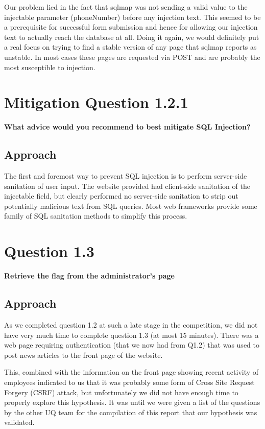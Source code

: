 Our problem lied in the fact that sqlmap was not sending a
valid value to the injectable parameter (phoneNumber) before any injection text.
This seemed to be a prerequisite for successful form submission and hence for
allowing our injection text to actually reach the database at all. Doing it
again, we would definitely put a real focus on trying to find a stable version
of any page that sqlmap reports as unstable. In most cases these pages are
requested via POST and are probably the most susceptible to injection.

\section{Mitigation Question 1.2.1}
\textbf{What advice would you recommend to best mitigate SQL Injection?}
\subsection{Approach}
The first and foremost way to prevent SQL injection is to perform server-side
sanitation of user input. The website provided had client-side sanitation of the
injectable field, but clearly performed no server-side sanitation to strip out
potentially malicious text from SQL queries. Most web frameworks provide some
family of SQL sanitation methods to simplify this process.

\section{Question 1.3}
\textbf{Retrieve the flag from the administrator's page}
\subsection{Approach}
As we completed question 1.2 at such a late stage in the competition, we did not
have very much time to complete question 1.3 (at most 15 minutes). There was a
web page requiring authentication (that we now had from Q1.2) that was used to
post news articles to the front page of the website.

This, combined with the information on the front page showing recent activity of
employees indicated to us that it was probably some form of Cross Site Request
Forgery (CSRF) attack, but unfortunately we did not have enough time to properly
explore this hypothesis. It was until we were given a list of the questions by
the other UQ team for the compilation of this report that our hypothesis was
validated.

